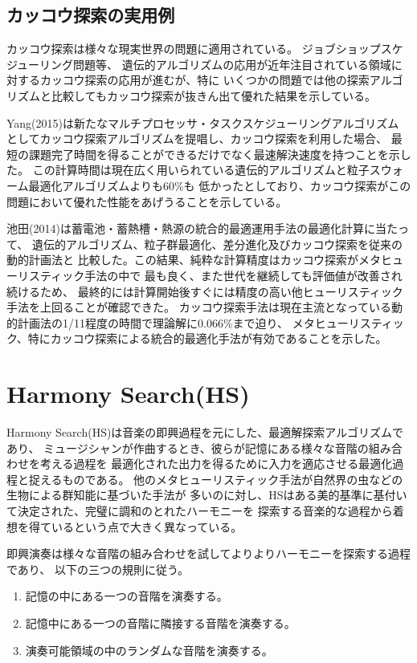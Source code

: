 \documentclass[uplatex]{jsarticle}
\begin{document}
\subsection{カッコウ探索の実用例}
カッコウ探索は様々な現実世界の問題に適用されている。
ジョブショップスケジューリング問題等、
遺伝的アルゴリズムの応用が近年注目されている領域に対するカッコウ探索の応用が進むが、特に
いくつかの問題では他の探索アルゴリズムと比較してもカッコウ探索が抜きん出て優れた結果を示している。

Yang(2015)は新たなマルチプロセッサ・タスクスケジューリングアルゴリズム
としてカッコウ探索アルゴリズムを提唱し、カッコウ探索を利用した場合、
最短の課題完了時間を得ることができるだけでなく最速解決速度を持つことを示した。
この計算時間は現在広く用いられている遺伝的アルゴリズムと粒子スウォーム最適化アルゴリズムよりも60\%も
低かったとしており、カッコウ探索がこの問題において優れた性能をあげうることを示している。

池田(2014)は蓄電池・蓄熱槽・熱源の統合的最適運用手法の最適化計算に当たって、
遺伝的アルゴリズム、粒子群最適化、差分進化及びカッコウ探索を従来の動的計画法と
比較した。この結果、純粋な計算精度はカッコウ探索がメタヒューリスティック手法の中で
最も良く、また世代を継続しても評価値が改善され続けるため、
最終的には計算開始後すぐには精度の高い他ヒューリスティック手法を上回ることが確認できた。
カッコウ探索手法は現在主流となっている動的計画法の1/11程度の時間で理論解に0.066\%まで迫り、
メタヒューリスティック、特にカッコウ探索による統合的最適化手法が有効であることを示した。


\section{Harmony Search(HS)}
Harmony Search(HS)は音楽の即興過程を元にした、最適解探索アルゴリズムであり、
ミュージシャンが作曲するとき、彼らが記憶にある様々な音階の組み合わせを考える過程を
最適化された出力を得るために入力を適応させる最適化過程と捉えるものである。
他のメタヒューリスティック手法が自然界の虫などの生物による群知能に基づいた手法が
多いのに対し、HSはある美的基準に基付いて決定された、完璧に調和のとれたハーモニーを
探索する音楽的な過程から着想を得ているという点で大きく異なっている。

即興演奏は様々な音階の組み合わせを試してよりよりハーモニーを探索する過程であり、
以下の三つの規則に従う。

\begin{enumerate}
  \item 記憶の中にある一つの音階を演奏する。
  \item 記憶中にある一つの音階に隣接する音階を演奏する。
  \item 演奏可能領域の中のランダムな音階を演奏する。
\end{enumerate}
\end{document}
